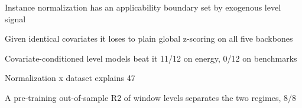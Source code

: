 \item Instance normalization has an applicability boundary set by exogenous level signal
\item Given identical covariates it loses to plain global z-scoring on all five backbones
\item Covariate-conditioned level models beat it 11/12 on energy, 0/12 on benchmarks
\item Normalization x dataset explains 47%
\item A pre-training out-of-sample R2 of window levels separates the two regimes, 8/8
